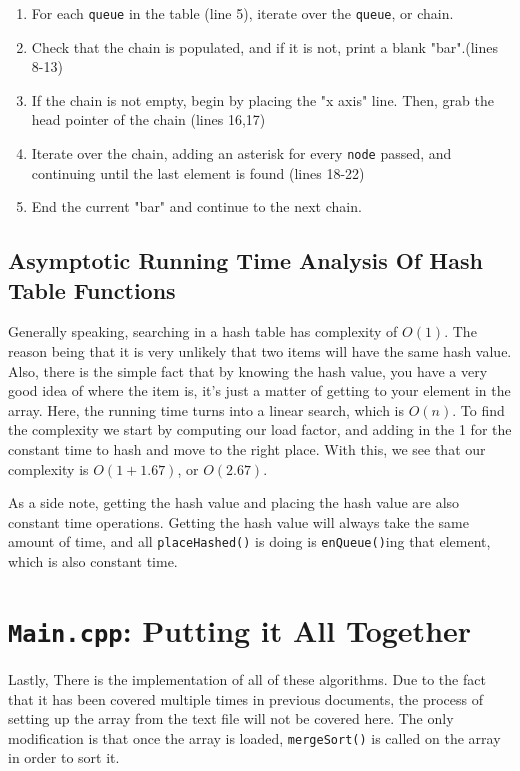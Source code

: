 \documentclass[letterpaper, 10pt]{article}
\begin{document}
\begin{enumerate}
    \item For each \texttt{queue} in the table (line 5), iterate over the \texttt{queue}, or chain.
    \item Check that the chain is populated, and if it is not, print a blank "bar".(lines 8-13)
    \item If the chain is not empty, begin by placing the "x axis" line. Then, grab the head pointer of the chain (lines 16,17)
    \item Iterate over the chain, adding an asterisk for every \texttt{node} passed, and continuing until the last element is found (lines 18-22)
    \item End the current "bar" and continue to the next chain.
\end{enumerate}
\subsection{Asymptotic Running Time Analysis Of Hash Table Functions}

Generally speaking, searching in a hash table has complexity of $O(1)$. The reason being that it is very unlikely that two items will have the same hash value. Also, there is the simple fact that by knowing the hash value, you have a very good idea of where the item is, it's just a matter of getting to your element in the array. Here, the running time turns into a linear search, which is $O(n)$. To find the complexity we start by computing our load factor, and adding in the 1 for the constant time to hash and move to the right  place. With this, we see that our complexity is $O(1+1.67)$, or $O(2.67)$.

As a side note, getting the hash value and placing the hash value are also constant time operations. Getting the hash value will always take the same amount of time, and all \texttt{placeHashed()} is doing is \texttt{enQueue()}ing that element, which is also constant time.

\section{ \texttt{Main.cpp}: Putting it All Together}

Lastly, There is the implementation of all of these algorithms. Due to the fact that it has been covered multiple times in previous documents, the process of setting up the array from the text file will not be covered here. The only modification is that once the array is loaded, \texttt{mergeSort()} is called on the array in order to sort it.
\end{document}

